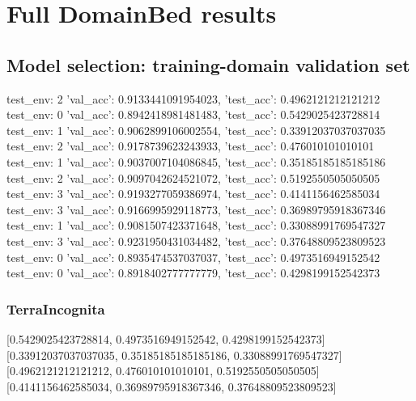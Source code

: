 \documentclass{article}
\begin{document}
\section{Full DomainBed results}

\subsection{Model selection: training-domain validation set}
test_env: 2
{'val_acc': 0.9133441091954023, 'test_acc': 0.4962121212121212}
test_env: 0
{'val_acc': 0.8942418981481483, 'test_acc': 0.5429025423728814}
test_env: 1
{'val_acc': 0.9062899106002554, 'test_acc': 0.33912037037037035}
test_env: 2
{'val_acc': 0.9178739623243933, 'test_acc': 0.476010101010101}
test_env: 1
{'val_acc': 0.9037007104086845, 'test_acc': 0.35185185185185186}
test_env: 2
{'val_acc': 0.9097042624521072, 'test_acc': 0.5192550505050505}
test_env: 3
{'val_acc': 0.9193277059386974, 'test_acc': 0.4141156462585034}
test_env: 3
{'val_acc': 0.9166995929118773, 'test_acc': 0.36989795918367346}
test_env: 1
{'val_acc': 0.9081507423371648, 'test_acc': 0.33088991769547327}
test_env: 3
{'val_acc': 0.9231950431034482, 'test_acc': 0.37648809523809523}
test_env: 0
{'val_acc': 0.8935474537037037, 'test_acc': 0.4973516949152542}
test_env: 0
{'val_acc': 0.8918402777777779, 'test_acc': 0.4298199152542373}

\subsubsection{TerraIncognita}
[0.5429025423728814, 0.4973516949152542, 0.4298199152542373]
[0.33912037037037035, 0.35185185185185186, 0.33088991769547327]
[0.4962121212121212, 0.476010101010101, 0.5192550505050505]
[0.4141156462585034, 0.36989795918367346, 0.37648809523809523]

\begin{center}
\end{center}
\end{document}
